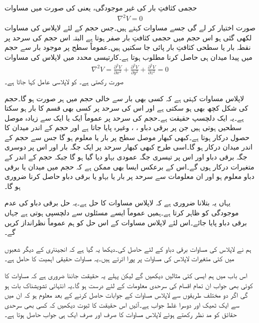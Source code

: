 حجمی کثافتِ بار کی غیر موجودگی، یعنی  کی صورت میں مساوات 
\begin{align}\label{مساوات_لاپلاس_لاپلاس_نقطہ_شکل}
\nabla^2 V=0
\end{align}
صورت اختیار کر لے گی جسے  مساوات کہتے ہیں۔جس حجم کے لئے لاپلاس کی مساوات لکھی گئی ہو اس حجم میں حجمی کثافتِ بار صفر ہوتا ہے البتہ اس حجم کی سرحد پر نقطہ بار یا سطحی کثافتِ بار پائی جا سکتیں ہیں۔عموماً سطح پر موجود بار سے حجم میں پیدا میدان ہی حاصل کرنا مطلوب ہوتا ہے۔کارتیسی محدد میں لاپلاس کی مساوات
\begin{align}\label{مساوات_لاپلاس_لاپلاس_کارتیسی_شکل}
\nabla^2 V=\frac{\partial^2 V}{\partial x^2}+\frac{\partial^2 V}{\partial y^2}+\frac{\partial^2 V}{\partial z^2}=0
\end{align}
صورت رکھتی ہے۔ کو لاپلاسی عامل کہا جاتا ہے۔

لاپلاس مساوات کہتی ہے کہ کسی بھی بار سے خالی حجم میں ہر صورت  ہو گا۔حجم کی شکل کچھ بھی ہو سکتی ہے اور اس کی سرحد پر کسی بھی قسم کا بار ہو سکتا ہے۔یہ ایک دلچسپ حقیقت ہے۔حجم کی سرحد پر عموماً ایک یا ایک سے زیادہ موصل سطحیں ہوتی ہیں جن پر برقی دباو ، ،  وغیرہ پایا جاتا ہے اور حجم کے اندر میدان کا حصول درکار ہوتا ہے۔کبھی کبھار موصل سطح پر بار یا  معلوم ہو گا جس سے حجم کے اندر میدان درکار ہو گا۔اسی طرح کبھی کبھار سرحد پر ایک جگہ بار اور اس پر دوسری جگہ برقی دباو اور اس پر تیسری  جگہ عمودی بہاو دیا گیا ہو گا جبکہ حجم کے اندر کے متغیرات درکار ہوں گے۔اس کے برعکس ایسا بھی ممکن ہے کہ حجم میں میدان یا برقی دباو معلوم ہو اور ان معلومات سے سرحد پر بار یا بہاو یا برقی دباو حاصل کرنا ضروری ہو گا۔

یہاں یہ بتلانا ضروری ہے کہ  لاپلاس مساوات کا حل ہے۔یہ حل برقی دباو کی عدم موجودگی کو ظاہر کرتا ہے۔ہمیں عموماً ایسے مسئلوں سے دلچسپی ہوتی ہے جہاں برقی دباو پایا جائے۔اس لئے  لاپلاس مساوات کے اس حل کو ہم عموماً نظرانداز کریں گے۔ 

ہم نے لاپلاس کی مساوات برقی دباو کے لئے حاصل کی۔دیکھا یہ گیا ہے کہ انجینئری کے دیگر شعبوں میں کئی متغیرات لاپلاس کی مساوات پر پورا اترتے ہیں۔یہ مساوات حقیقی اہمیت کا حامل ہے۔ 

اس باب میں ہم ایسی کئی مثالیں دیکھیں گے لیکن پہلے یہ حقیقت جاننا ضروری ہے کہ مساوات  کا کوئی بھی جواب ان تمام اقسام کی سرحدی معلومات کے لئے درست ہو گا۔یہ انتہائی تشویشناک بات ہو گی اگر دو مختلف طریقوں سے لاپلاس مساوات کے جوابات حاصل کرنے کے بعد معلوم ہو کہ ان میں سے ایک ٹھیک اور دوسرا غلط جواب ہے۔آئیں اس حقیقت کا ثبوت دیکھیں کہ کسی بھی سرحدی حقائق کو مد نظر رکھتے ہوئے لاپلاس مساوات کا صرف اور صرف ایک ہی جواب حاصل ہوتا ہے۔

